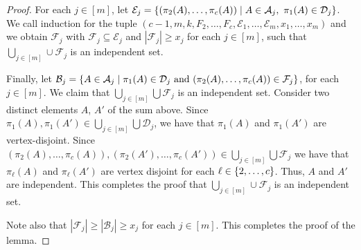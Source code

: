 \documentclass{patmorin}
\newcommand{\pat}[1]{\textcolor{Blue}{[Pat: #1]}}
\newcommand{\piotr}[1]{\textcolor{red}{Piotr: #1}}
\DeclarePairedDelimiter\set{\{}{\}}
\begin{document}
\begin{proof}
For each $j\in[m]$, let $\mathcal{E}_j=\set{(\pi_2(A),\ldots,\pi_c(A))\mid A\in\mathcal{A}_j,\ \pi_1(A)\in \mathcal{D}_j}$. 
We call induction for the tuple 
$(c-1,m,k,F_2,\ldots,F_{c},\mathcal{E}_1,\ldots,\mathcal{E}_m,x_1,\ldots,x_m)$ and 
we obtain $\mathcal{F}_j$ with 
$\mathcal{F}_j\subseteq \mathcal{E}_j$ and $|\mathcal{F}_j|\geq x_j$ for each $j\in [m]$, 
such that $\bigcup_{j\in[m]}\cup\mathcal{F}_j$ is an independent set.

Finally, let $\mathcal{B}_j=\set{A\in\mathcal{A}_j\mid \pi_1(A)\in \mathcal{D}_j \textrm{ and } (\pi_2(A),\ldots,\pi_c(A))\in\mathcal{F}_j}$, for each $j\in[m]$. 
We claim that $\bigcup_{j\in[m]}\bigcup 
\mathcal{F}_j$ is an independent set. 
Consider two distinct elements $A$, $A'$ of the sum above. 
Since $\pi_1(A), \pi_1(A')\in\bigcup_{j\in[m]}\bigcup 
\mathcal{D}_j$, we have that $\pi_1(A)$ and $\pi_1(A')$ are vertex-disjoint. 
Since $(\pi_2(A),\ldots,\pi_c(A)), (\pi_2(A'),\ldots,\pi_c(A'))\in\bigcup_{j\in[m]}\bigcup 
\mathcal{F}_j$ we have that $\pi_\ell(A)$ and $\pi_{\ell}(A')$ are vertex disjoint for each $\ell\in\set{2,\ldots,c}$.
Thus, $A$ and $A'$ are independent. 
This completes the proof that $\bigcup_{j\in[m]}\cup 
\mathcal{F}_j$ is an independent set. 

Note also that $|\mathcal{F}_j|\geq |\mathcal{B}_j|\geq x_j$ for each $j\in[m]$. 
This completes the proof of the lemma.
\end{proof}

\end{document}

